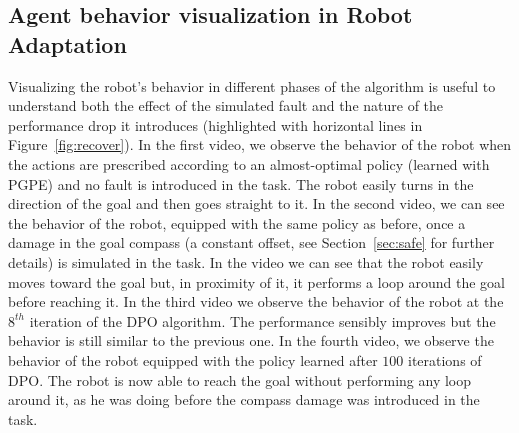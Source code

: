 \subsection{Agent behavior visualization in Robot Adaptation}\label{sec:videos}
Visualizing the robot's behavior in different phases of the algorithm is useful to understand both the effect of the simulated fault and the nature of the performance drop it introduces (highlighted with horizontal lines in Figure~\ref{fig:recover}). In the first video, we observe the behavior of the robot when the actions are prescribed according to an almost-optimal policy (learned with \ac{PGPE}) and no fault is introduced in the task. The robot easily turns in the direction of the goal and then goes straight to it. In the second video, we can see the behavior of the robot, equipped with the same policy as before, once a damage in the goal compass (a constant offset, see Section~\ref{sec:safe} for further details) is simulated in the task. In the video we can see that the robot easily moves toward the goal but, in proximity of it, it performs a loop around the goal before reaching it. In the third video we observe the behavior of the robot at the $8^{th}$ iteration of the \ac{DPO} algorithm. The performance sensibly improves but the behavior is still similar to the previous one. In the fourth video, we observe the behavior of the robot equipped with the policy learned after $100$ iterations of \ac{DPO}. The robot is now able to reach the goal without performing any loop around it, as he was doing before the compass damage was introduced in the task.

